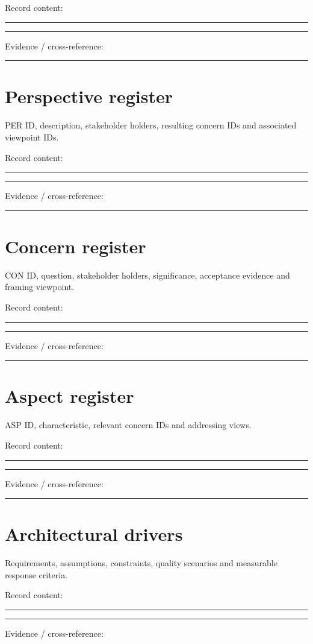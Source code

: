 \documentclass[11pt,letterpaper]{article}
\newcommand{\docsection}[1]{\Needspace{5\baselineskip}\section{#1}}
\begin{document}
Record content:

\noindent\rule{\linewidth}{0.35pt}\par\vspace{0.7em}
\noindent\rule{\linewidth}{0.35pt}\par\vspace{0.7em}
Evidence / cross-reference:

\noindent\rule{\linewidth}{0.35pt}\par
\docsection{Perspective register}
PER ID, description, stakeholder holders, resulting concern IDs and associated viewpoint IDs.

Record content:

\noindent\rule{\linewidth}{0.35pt}\par\vspace{0.7em}
\noindent\rule{\linewidth}{0.35pt}\par\vspace{0.7em}
Evidence / cross-reference:

\noindent\rule{\linewidth}{0.35pt}\par
\docsection{Concern register}
CON ID, question, stakeholder holders, significance, acceptance evidence and framing viewpoint.

Record content:

\noindent\rule{\linewidth}{0.35pt}\par\vspace{0.7em}
\noindent\rule{\linewidth}{0.35pt}\par\vspace{0.7em}
Evidence / cross-reference:

\noindent\rule{\linewidth}{0.35pt}\par
\docsection{Aspect register}
ASP ID, characteristic, relevant concern IDs and addressing views.

Record content:

\noindent\rule{\linewidth}{0.35pt}\par\vspace{0.7em}
\noindent\rule{\linewidth}{0.35pt}\par\vspace{0.7em}
Evidence / cross-reference:

\noindent\rule{\linewidth}{0.35pt}\par
\docsection{Architectural drivers}
Requirements, assumptions, constraints, quality scenarios and measurable response criteria.

Record content:

\noindent\rule{\linewidth}{0.35pt}\par\vspace{0.7em}
\noindent\rule{\linewidth}{0.35pt}\par\vspace{0.7em}
Evidence / cross-reference:
\end{document}
